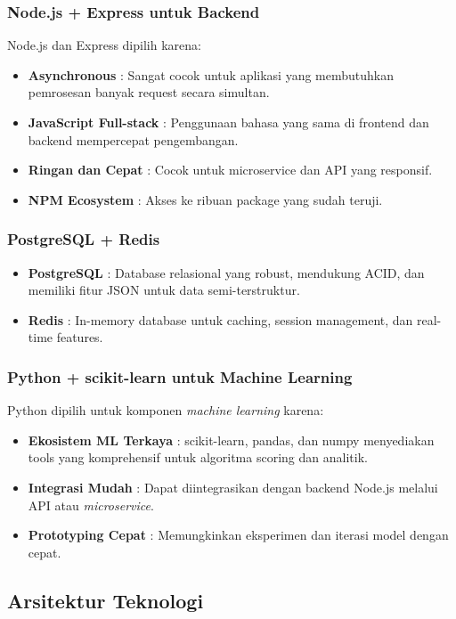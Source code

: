 \subsubsection{Node.js + Express untuk Backend}
Node.js dan Express dipilih karena:
\begin{itemize}[leftmargin=*]
    \item \textbf{Asynchronous} : Sangat cocok untuk aplikasi yang membutuhkan pemrosesan banyak request secara simultan.
    \item \textbf{JavaScript Full-stack} : Penggunaan bahasa yang sama di frontend dan backend mempercepat pengembangan.
    \item \textbf{Ringan dan Cepat} : Cocok untuk microservice dan API yang responsif.
    \item \textbf{NPM Ecosystem} : Akses ke ribuan package yang sudah teruji.
\end{itemize}

\subsubsection{PostgreSQL + Redis}
\begin{itemize}[leftmargin=*]
    \item \textbf{PostgreSQL} : Database relasional yang robust, mendukung ACID, dan memiliki fitur JSON untuk data semi-terstruktur.
    \item \textbf{Redis} : In-memory database untuk caching, session management, dan real-time features.
\end{itemize}

\subsubsection{Python + scikit-learn untuk Machine Learning}
Python dipilih untuk komponen \textit{machine learning} karena:
\begin{itemize}[leftmargin=*]
    \item \textbf{Ekosistem ML Terkaya} : scikit-learn, pandas, dan numpy menyediakan tools yang komprehensif untuk algoritma scoring dan analitik.
    \item \textbf{Integrasi Mudah} : Dapat diintegrasikan dengan backend Node.js melalui API atau \textit{microservice}.
    \item \textbf{Prototyping Cepat} : Memungkinkan eksperimen dan iterasi model dengan cepat.
\end{itemize}

\subsection{Arsitektur Teknologi}

